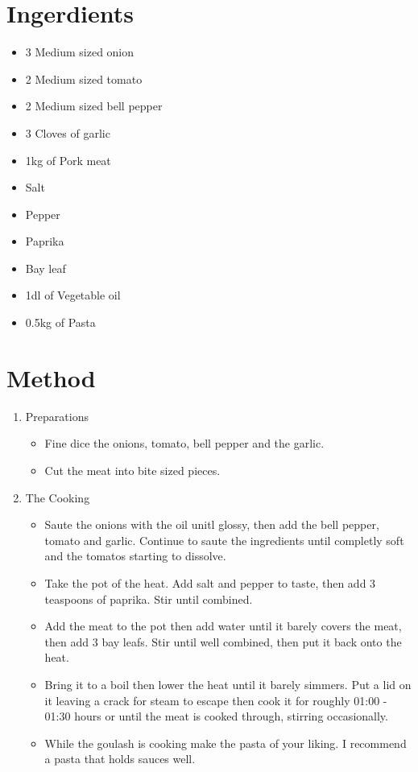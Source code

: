 \documentclass[
	11pt, %
	fleqn, %
	a4paper, %
]{LegrandOrangeBook}
\begin{document}
		\section{Ingerdients}
			\begin{itemize}
				\item 3 Medium sized onion
				\item 2 Medium sized tomato
				\item 2 Medium sized bell pepper
				\item 3 Cloves of garlic
				\item 1kg of Pork meat
				\item Salt
				\item Pepper
				\item Paprika
				\item Bay leaf
				\item 1dl of Vegetable oil
				\item 0.5kg of Pasta
			\end{itemize}
		\section{Method}
			\begin{enumerate}
				\item Preparations
					\begin{itemize}
						\item Fine dice the onions, tomato, bell pepper and the garlic.
						\item Cut the meat into bite sized pieces.
					\end{itemize}
				\item The Cooking
					\begin{itemize}
						\item Saute the onions with the oil unitl glossy, then add the bell pepper, tomato and garlic. Continue to saute the ingredients until completly soft and the tomatos starting to dissolve.
						\item Take the pot of the heat. Add salt and pepper to taste, then add 3 teaspoons of paprika. Stir until combined.
						\item Add the meat to the pot then add water until it barely covers the meat, then add 3 bay leafs. Stir until well combined, then put it back onto the heat.
						\item Bring it to a boil then lower the heat until it barely simmers. Put a lid on it leaving a crack for steam to escape then cook it for roughly 01:00 - 01:30 hours or until the meat is cooked through, stirring occasionally.
						\item While the goulash is cooking make the pasta of your liking. I recommend a pasta that holds sauces well.
					\end{itemize}
			\end{enumerate}
\end{document}
